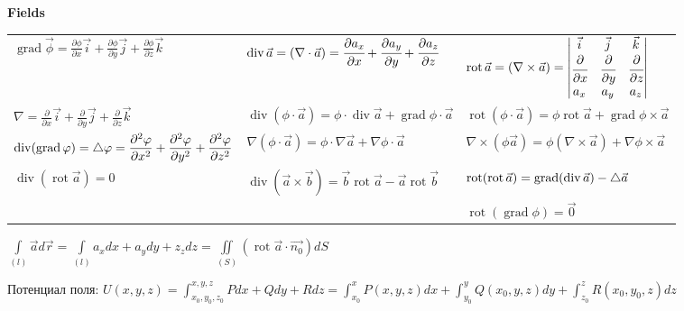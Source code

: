 \begin{center}
    \textbf{Fields}
\end{center}


\begin{tabular}{|l|l|l|}
    $\displaystyle\operatorname{grad}{\vec{\phi}} = \frac{\partial{\phi}}{\partial{x}}\vec{i}+\frac{\partial{\phi}}{\partial{y}}\vec{j}+\frac{\partial{\phi}}{\partial{z}}\vec{k}$
    &
    $\displaystyle \operatorname{div}\vec{a} = (\nabla\cdot\vec{a}) = \cfrac{\partial a_x}{\partial x} + \cfrac{\partial a_y}{\partial y}+\cfrac{\partial a_z}{\partial z}$
    & 
    $\displaystyle\operatorname{rot}\vec{a} = (\nabla\times\vec{a})=
    \begin{vmatrix}
    \vec{i} & \vec{j} & \vec{k} \\
    \cfrac{\partial}{\partial x} & \cfrac{\partial}{\partial y} &
    \cfrac{\partial}{\partial z} \\
    a_x & a_y & a_z
    \end{vmatrix}$
    \\
    
    $\displaystyle\nabla=\frac{\partial}{\partial{x}}\vec{i}+\frac{\partial}{\partial{y}}\vec{j}+\frac{\partial}{\partial{z}}\vec{k}$
    &
    $\displaystyle\operatorname{div}(\phi\cdot\vec{a}) = \phi\cdot\operatorname{div}\vec{a}+\operatorname{grad}{\phi}\cdot\vec{a}$
    & 
    $\displaystyle\operatorname{rot}(\phi\cdot\vec{a}) = \phi\operatorname{rot}\vec{a}+\operatorname{grad}\phi\times\vec{a}$
    \\
    
    $\displaystyle\operatorname{div}(\operatorname{grad}\varphi) = \mathop{}\!\mathbin\bigtriangleup\varphi = \frac{\partial^2\varphi}{\partial{x^2}} + \frac{\partial^2\varphi}{\partial{y^2}} + \frac{\partial^2\varphi}{\partial{z^2}}$
    &
    $\displaystyle\nabla{(\phi\cdot\vec{a})} = \phi\cdot\nabla\vec{a}+\nabla\phi\cdot\vec{a}$
    &
    $\displaystyle\nabla\times(\phi\vec{a}) = \phi(\nabla\times\vec{a})+\nabla\phi\times\vec{a}$
    \\
    
    $\displaystyle\operatorname{div}(\operatorname{rot}\vec{a}) = 0$
    &
    $\displaystyle\operatorname{div}(\vec{a}\times\vec{b}) = \vec{b}\operatorname{rot}\vec{a}-\vec{a}\operatorname{rot}\vec{b}$
    & 
    $\displaystyle\operatorname{rot}(\operatorname{rot}\vec{a}) = \operatorname{grad}(\operatorname{div}\vec{a}) - \mathop{}\!\mathbin\bigtriangleup\vec{a}$
    \\
    
    &
    &
    $\displaystyle\operatorname{rot}(\operatorname{grad}\phi) = \vec{0}$
    \\
\end{tabular}

$\displaystyle\int\limits_{(l)}\vec{a}d\vec{r} = \int\limits_{(l)}a_xdx+a_ydy+z_zdz = \iint\limits_{(S)}(\operatorname{rot}\vec{a}\cdot\vec{n_0})dS$

Потенциал поля: $\displaystyle
U(x,y,z) = \int_{x_0, y_0, z_0}^{x,y,z} Pdx+Qdy+Rdz =
\int_{x_0}^{x} P(x,y,z)dx + \int_{y_0}^{y}Q(x_0,y,z)dy +
\int_{z_0}^{z} R(x_0,y_0,z)dz$

